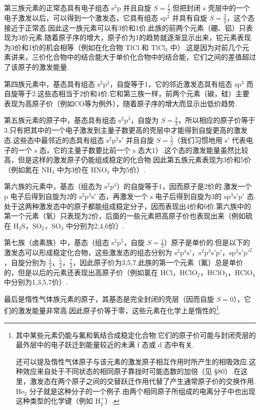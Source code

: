第三族元素的正常态具有电子组态 $\mathrm{s}^2\mathrm{p}$ 并且自旋 $S=\frac{1}{2}$.但把封闭 $\mathrm{s}$ 壳层中的一个电子激发以后，可以得到一个激发态，它具有组态 $\mathrm{sp}^2$ 并具有自旋 $S=\frac{3}{2}$，这个态接近于正常态.因此这一族元素可以有3价和1价.此族的前两个元素（硼、铝）只表现为3价元素.随着原子序的增大，原子价为1的趋势就逐渐显示出来，铊元素表现为3价和1价的机会相等（例如在化合物 TlCl 和 $\mathrm{TlCl}_3$ 中）.这是因为对前几个元素讲来，三价化合物中的结合能大于单价化合物中的结合能，它们之间的差值超过了该原子的激发能量.

第四族元素中，基态具有组态 $\mathrm{s}^2\mathrm{p}^2$，自旋等于1，它的邻近激发态具有组态 $\mathrm{sp}^3$ 而自旋等于2.这些态相当于2价和4价.它和第三族一样，前两个元素（碳，硅）主要表现为高原子价（例如CO等为例外），随着原子序的增大而显示出低价趋势.

第五族元素的原子中，基态具有组态 $\mathrm{s}^2\mathrm{p}^3$，自旋为 $S=\frac{3}{2}$，所以相应的原子价等于3.只有把其中的一个电子激发到主量子数更高的壳层中才能得到自旋更高的激发态.这些态中最邻近的态具有组态 $\mathrm{s}^2\mathrm{p}^2\mathrm{s}'$ 并且自旋 $S=\frac{5}{2}$（我们习惯地用 $\mathrm{s}'$ 代表电子的一个 $\mathrm{s}$ 态，它的主量子数要比前一个 $\mathrm{s}$ 态大1）.这个态的激发能量虽然比较高，但是这样的激发原子仍能组成稳定的化合物.因此第五族元素表现为3价和5价（例如氮在 $\mathrm{NH}_3$ 中为3价在 $\mathrm{HNO}_3$ 中为5价）.

第六族的元素中，基态（组态为 $\mathrm{s}^2\mathrm{p}^4$）的自旋等于1，因而原子是2价的.激发一个 $\mathrm{p}$ 电子后得到自旋为2的 $\mathrm{s}^2\mathrm{p}^3\mathrm{s}'$ 态，再激发一个 $\mathrm{s}$ 电子后得到自旋为3的 $\mathrm{sp}^3\mathrm{s}'\mathrm{p}'$ 态.处于这两种激发态中的原子都能组成稳定分子，因而表现出4价和6价.第六族中的第一个元素（氧）只表现为2价，后面的一些元素把高原子价也表现出来（例如硫在 $\mathrm{H}_2\mathrm{S}$，$\mathrm{SO}_2$，$\mathrm{SO}_3$ 中分别为2,4,6价）.

第七族（卤素族）中，基态（组态 $\mathrm{s}^2\mathrm{p}^5$，自旋 $S=\frac{1}{2}$）原子是单价的.但是以下的激发态可以形成稳定化合物，这些激发态的组态分别为 $\mathrm{s}^2\mathrm{p}^4\mathrm{s}'$，$\mathrm{s}^2\mathrm{p}^3\mathrm{s}'\mathrm{p}'$，$\mathrm{sp}^3\mathrm{s}'\mathrm{p}'^2$，自旋分别为 $\frac{3}{2}$，$\frac{5}{2}$，$\frac{7}{2}$，因此原子价为3,5,7.此族的第一个元素（氟）总是单价的，但是以后的元素还表现出高原子价（例如氯在 HCl，$\mathrm{HClO}_2$，$\mathrm{HClO}_3$，$\mathrm{HClO}_4$ 中分别为1,3,5,7价）.

最后是惰性气体族元素的原子，其基态是完全封闭的壳层（因而自旋 $S=0$），它们的激发能量非常高.因此原子价等于零，这些元素在化学上是惰性的\footnote{其中某些元素仍能与氟和氧结合成稳定化合物.它们的原子价可能与封闭壳层的最外层中的电子跃迁到能量较近的未满 f 态或 d 态中有关.\par 还可以提及惰性气体原子与该元素的激发原子相互作用时所产生的相吸效应.这种效应来自处于不同状态的相同原子靠拢时可能态数的加倍（见 §80）.在这里，激发态在两个原子之间的交替跃迁作用代替了产生通常原子价的交换作用.$\mathrm{He}_2$ 分子就是这种分子的一个例子.由两个相同原子所组成的电离分子中也出现这种类型的化学键（例如 $\mathrm{H}_2^+$）.}.

